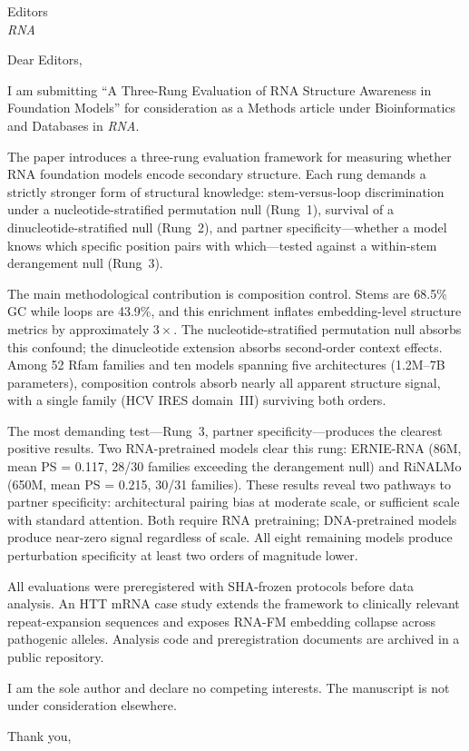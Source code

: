 \documentclass[11pt]{letter}
\begin{document}
\begin{letter}{Editors \\ \textit{RNA}}

\opening{Dear Editors,}

I am submitting ``A Three-Rung Evaluation of RNA Structure Awareness in Foundation Models'' for consideration as a Methods article under Bioinformatics and Databases in \textit{RNA}.

The paper introduces a three-rung evaluation framework for measuring whether RNA foundation models encode secondary structure. Each rung demands a strictly stronger form of structural knowledge: stem-versus-loop discrimination under a nucleotide-stratified permutation null (Rung~1), survival of a dinucleotide-stratified null (Rung~2), and partner specificity---whether a model knows which specific position pairs with which---tested against a within-stem derangement null (Rung~3).

The main methodological contribution is composition control. Stems are 68.5\% GC while loops are 43.9\%, and this enrichment inflates embedding-level structure metrics by approximately $3\times$. The nucleotide-stratified permutation null absorbs this confound; the dinucleotide extension absorbs second-order context effects. Among 52 Rfam families and ten models spanning five architectures (1.2M--7B parameters), composition controls absorb nearly all apparent structure signal, with a single family (HCV IRES domain~III) surviving both orders.

The most demanding test---Rung~3, partner specificity---produces the clearest positive results. Two RNA-pretrained models clear this rung: ERNIE-RNA (86M, mean PS = 0.117, 28/30 families exceeding the derangement null) and RiNALMo (650M, mean PS = 0.215, 30/31 families). These results reveal two pathways to partner specificity: architectural pairing bias at moderate scale, or sufficient scale with standard attention. Both require RNA pretraining; DNA-pretrained models produce near-zero signal regardless of scale. All eight remaining models produce perturbation specificity at least two orders of magnitude lower.

All evaluations were preregistered with SHA-frozen protocols before data analysis. An HTT mRNA case study extends the framework to clinically relevant repeat-expansion sequences and exposes RNA-FM embedding collapse across pathogenic alleles. Analysis code and preregistration documents are archived in a public repository.

I am the sole author and declare no competing interests. The manuscript is not under consideration elsewhere.

\closing{Thank you,}

\end{letter}
\end{document}
